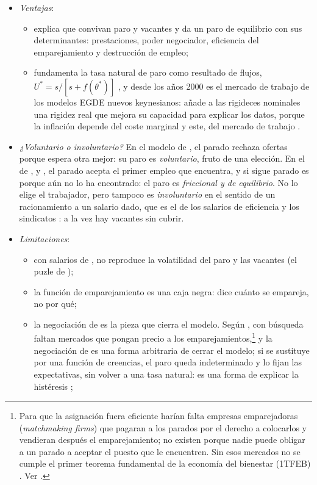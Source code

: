 \documentclass[11pt]{article}
\begin{document}
\begin{itemize}
\item \emph{Ventajas}:
  \begin{itemize}
  \item explica que convivan paro y vacantes y da un paro de equilibrio con sus determinantes: prestaciones, poder negociador, eficiencia del emparejamiento y destrucción de empleo;
  \item fundamenta la tasa natural de paro como resultado de flujos, $U^*=s/[s+f(\theta^*)]$ , y desde los años 2000 es el mercado de trabajo de los modelos EGDE nuevos keynesianos: añade a las rigideces nominales una rigidez real que mejora su capacidad para explicar los datos, porque la inflación depende del coste marginal y este, del mercado de trabajo\nocite{BlanchardGali2010Labor}  .
  \end{itemize}
\item \emph{¿Voluntario o involuntario?} En el modelo de , el parado rechaza ofertas porque espera otra mejor: su paro es \emph{voluntario}, fruto de una elección. En el de ,  y , el parado acepta el primer empleo que encuentra, y si sigue parado es porque aún no lo ha encontrado: el paro es \emph{friccional y de equilibrio}. No lo elige el trabajador, pero tampoco es \emph{involuntario} en el sentido de un racionamiento a un salario dado, que es el de los salarios de eficiencia y los sindicatos : a la vez hay vacantes sin cubrir\nocite{DeVroey2016History}.
\item \emph{Limitaciones}:
  \begin{itemize}
  \item con salarios de , no reproduce la volatilidad del paro y las vacantes (el puzle de );
  \item la función de emparejamiento es una caja negra: dice cuánto se empareja, no por qué;
  \item la negociación de  es la pieza que cierra el modelo. Según \textcite{Farmer2010Expectations}, con búsqueda faltan mercados que pongan precio a los emparejamientos,\footnote{Para que la asignación fuera eficiente harían falta empresas emparejadoras (\emph{matchmaking firms}) que pagaran a los parados por el derecho a colocarlos y vendieran después el emparejamiento; no existen porque nadie puede obligar a un parado a aceptar el puesto que le encuentren. Sin esos mercados no se cumple el primer teorema fundamental de la economía del bienestar (1TFEB) . Ver \textcite[cap.~20]{DeVroey2016History}.} y la negociación de  es una forma arbitraria de cerrar el modelo; si se sustituye por una función de creencias, el paro queda indeterminado y lo fijan las expectativas, sin volver a una tasa natural: es una forma de explicar la histéresis\nocite{Farmer2013Natural} ;

\end{itemize}
\end{itemize}
\end{document}
